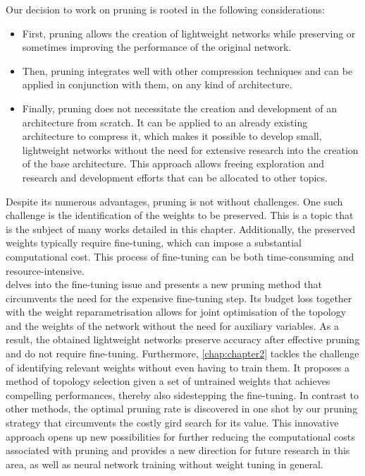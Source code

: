 \noindent Our decision to work on pruning is rooted in the following
considerations:
\begin{itemize}
  \item First, pruning allows the creation of lightweight networks while
  preserving or sometimes improving the performance of the original network.

  \item Then, pruning integrates well with other compression techniques and can
  be applied in conjunction with them, on any kind of architecture.

  \item  Finally, pruning does not necessitate the creation and development of
  an architecture from scratch. It can be applied to an already existing
  architecture to compress it, which makes it possible to develop small,
  lightweight networks without the need for extensive research into the creation
  of the base architecture. This approach allows freeing exploration and
  research and development efforts that can be allocated to other topics.

\end{itemize}

Despite its numerous advantages, pruning is not without challenges. One such
challenge is the identification of the weights to be preserved. This is a topic
that is the subject of many works detailed in this chapter. Additionally, the
preserved weights typically require fine-tuning, which can impose a substantial
computational cost. This process of fine-tuning can be both time-consuming and
resource-intensive.\\

 delves into the fine-tuning issue and presents a new
pruning method that circumvents the need for the expensive fine-tuning step. Its
budget loss together with the weight reparametrisation allows for joint
optimisation of the topology and the weights of the network without the need for
auxiliary variables. As a result, the obtained lightweight networks preserve
accuracy after effective pruning and do not require fine-tuning. Furthermore,
\cref{chap:chapter2} tackles the challenge of identifying relevant weights
without even having to train them. It proposes a method of topology selection
given a set of untrained weights that achieves compelling performances, thereby
also sidestepping the fine-tuning. In contrast to other methods, the optimal
pruning rate is discovered in one shot by our pruning strategy that circumvents
the costly gird search for its value. This innovative approach opens up new
possibilities for further reducing the computational costs associated with
pruning and provides a new direction for future research in this area, as well
as neural network training without weight tuning in general.\\



